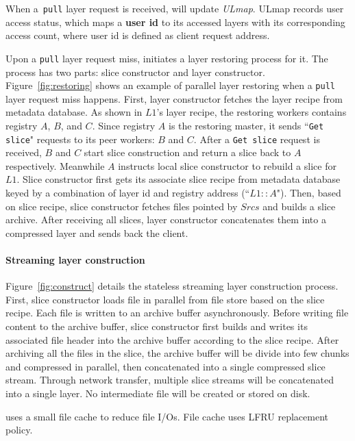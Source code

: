 When a~\texttt{pull} layer request is received, 
\sysname will update \emph{ULmap}. 
ULmap records user access status,
which maps a \textbf{user id} to its accessed layers with its corresponding access count,
where user id is defined as client request address.

Upon a \texttt{pull} layer request miss, 
\sysname initiates a layer restoring process for it.
The process has two parts: slice constructor and layer constructor.
Figure~\ref{fig:restoring} shows an example of parallel layer restoring when a \texttt{pull} layer request miss happens.
First, 
layer constructor fetches the layer recipe from metadata database.
As shown in $L1$'s layer recipe, 
the restoring workers contains registry $A$, $B$, and $C$.
Since registry $A$ is the restoring master,
it sends ``\texttt{Get slice}" requests to its peer workers: $B$ and $C$.
After a \texttt{Get slice} request is received, 
$B$ and $C$ start slice construction and return a slice back to $A$ respectively.
Meanwhile $A$ instructs local slice constructor to rebuild a slice for $L1$.
Slice constructor first gets its associate slice recipe from metadata database 
keyed by a combination of  layer id and registry address (``$L1::A$").
Then, based on slice recipe,
slice constructor fetches files pointed by $Srcs$
and builds a slice archive.
After receiving all slices, layer constructor concatenates them into a compressed layer
and sends back the client. 

\paragraph{Streaming layer construction}
Figure~\ref{fig:construct} details the stateless streaming layer construction process.
First, slice constructor loads file in parallel from file store based on the slice recipe.
Each file is written to an archive buffer asynchronously.
Before writing file content to the archive buffer, slice constructor first builds and writes its
associated 
file header into the archive buffer according to the slice recipe. 
After archiving all the files in the slice,
the archive buffer will be divide into few chunks and compressed in parallel,
then concatenated into a single compressed slice stream.
Through network transfer, multiple slice streams will be concatenated into a single layer.
No intermediate file will be created or stored on disk.

\sysname uses a small file cache to reduce file I/Os. 
File cache uses LFRU replacement policy.

